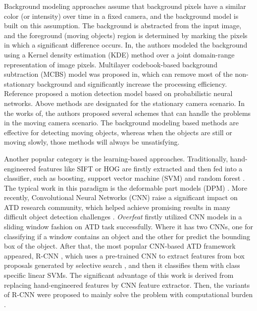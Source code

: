 \documentclass[journal]{IEEEtran}
\begin{document}
Background modeling approaches assume that background pixels have a similar color (or intensity) over time in a fixed camera, and the background model is built on this assumption. The background is abstracted from the input image, and the foreground (moving objects) region is determined by marking the pixels in which a significant difference occurs. In\cite{Sheikh2005BayesianScenes}, the authors modeled the background using a Kernel density estimation (KDE) method over a joint domain-range representation of image pixels. Multilayer codebook-based background subtraction (MCBS) model was proposed in\cite{Guo2013FastDetection}, which can remove most of the non-stationary background and significantly increase the processing efficiency. Reference\cite{Chen2015ProbabilisticSystems} proposed a motion detection model based on probabilistic neural networks. Above methods are designated for the stationary camera scenario. In the works of\cite{Yun2017SceneCamera}\cite{Hu2015MovingCamera}\cite{Francisco2015ForegroundApproximation}, the authors proposed several schemes that can handle the problems in the moving camera scenario. The background modeling based methods are effective for detecting moving objects, whereas when the objects are still or moving slowly, those methods will always be unsatisfying.

Another popular category is the learning-based approaches. Traditionally, hand-engineered features like SIFT \cite{Keypoints2004DistinctiveFrom} or HOG \cite{Dalal2010ToDetection} are firstly extracted and then fed into a classifier, such as boosting\cite{P.Viola2001RapidFeatures}, support vector machine (SVM)\cite{Suykens1999LeastClassifiers} and random forest \cite{Breiman2001Randomforest2001}. The typical work in this paradigm is the deformable part models (DPM) \cite{Felzenszwalb2009ObjectModels}. More recently, Convolutional Neural Networks (CNN) raise a significant impact on ATD research community, which helped achieve promising results in many difficult object detection challenges \cite{RussakovskyImageNetChallenge} \cite{Everingham2010TheChallenge} \cite{LinMicrosoftContext}. \textit{Overfeat} \cite{Sermanet2014OverFeat:Networks} firstly utilized CNN models in a sliding window fashion on ATD task successfully. Where it has two CNNs, one for classifying if a window contains an object and the other for predict the bounding box of the object. After that, the most popular CNN-based ATD framework appeared, R-CNN \cite{GirshickRichSegmentation}, which uses a pre-trained CNN to extract features from box proposals generated by selective search \cite{Uijlings2013SelectiveRecognition}, and then it classifies them with class specific linear SVMs. The significant advantage of this work is derived from replacing hand-engineered features by CNN feature extractor. Then, the variants of R-CNN were proposed to mainly solve the problem with computational burden \cite{Girshick2016} \cite{He2015} \cite{RenFasterNetworks}.
\end{document}
